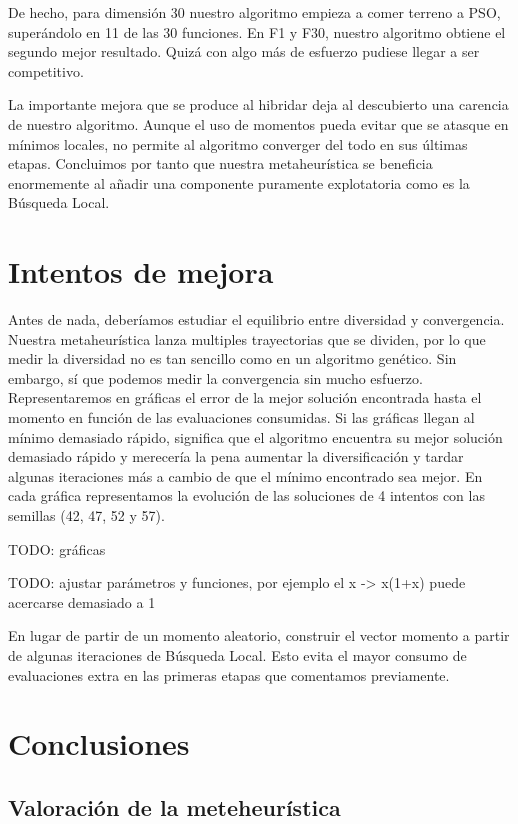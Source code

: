 \documentclass{article}
\begin{document}
De hecho, para dimensión 30 nuestro algoritmo empieza a comer terreno a PSO, superándolo en 11 de las 30 funciones. En F1 y F30, nuestro
algoritmo obtiene el segundo mejor resultado. Quizá con algo más de esfuerzo pudiese llegar a ser competitivo.

La importante mejora que se produce al hibridar deja al descubierto una carencia de nuestro algoritmo. Aunque el uso de momentos pueda
evitar que se atasque en mínimos locales, no permite al algoritmo converger del todo en sus últimas etapas. Concluimos por tanto que
nuestra metaheurística se beneficia enormemente al añadir una componente puramente explotatoria como es la Búsqueda Local.

\pagebreak

\section{Intentos de mejora}

Antes de nada, deberíamos estudiar el equilibrio entre diversidad y convergencia. Nuestra metaheurística lanza multiples trayectorias
que se dividen, por lo que medir la diversidad no es tan sencillo como en un algoritmo genético. Sin embargo, sí que podemos medir
la convergencia sin mucho esfuerzo. Representaremos en gráficas el error de la mejor solución encontrada hasta el momento
en función de las evaluaciones consumidas. Si las gráficas llegan al mínimo demasiado rápido, significa que el algoritmo
encuentra su mejor solución demasiado rápido y merecería la pena aumentar la diversificación y tardar algunas iteraciones
más a cambio de que el mínimo encontrado sea mejor. En cada gráfica representamos la evolución de las soluciones de 4 intentos
con las semillas (42, 47, 52 y 57).

TODO: gráficas




TODO: ajustar parámetros y funciones, por ejemplo el x -> x(1+x) puede acercarse demasiado a 1

En lugar de partir de un momento aleatorio, construir el vector momento a partir de algunas iteraciones de Búsqueda Local. Esto evita
el mayor consumo de evaluaciones extra en las primeras etapas que comentamos previamente. 

\section{Conclusiones}

\subsection{Valoración de la meteheurística}
\end{document}
